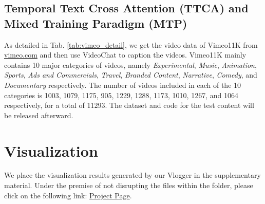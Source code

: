 \subsection{Temporal Text Cross Attention (TTCA) and Mixed Training Paradigm (MTP)}
As detailed in Tab. \ref{tab:vimeo_detail}, we get the video data of Vimeo11K from \href{https://vimeo.com/}{vimeo.com} and then use VideoChat \cite{Li2023VideoChatCV} to caption the videos.
Vimeo11K mainly contains 10 major categories of videos, namely \textit{Experimental}, \textit{Music}, \textit{Animation}, \textit{Sports}, \textit{Ads and Commercials}, \textit{Travel}, \textit{Branded Content}, \textit{Narrative}, \textit{Comedy}, and \textit{Documentary} respectively.
The number of videos included in each of the 10 categories is 1003, 1079, 1175, 905, 1229, 1288, 1173, 1010, 1267, and 1064 respectively, for a total of 11293.
The dataset and code for the test content will be released afterward. 


\section{Visualization}
\label{sub:visualization}
We place the visualization results generated by our Vlogger in the supplementary material. 
Under the premise of not disrupting the files within the folder, please click on the following link: \href{https://zhuangshaobin.github.io/Vlogger.github.io/}{Project Page}.


